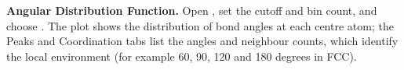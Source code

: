 \textbf{Angular Distribution Function.} Open , set the cutoff and bin count, and choose . The plot shows the distribution of bond angles at each centre atom; the Peaks and Coordination tabs list the angles and neighbour counts, which identify the local environment (for example 60, 90, 120 and 180 degrees in FCC).
